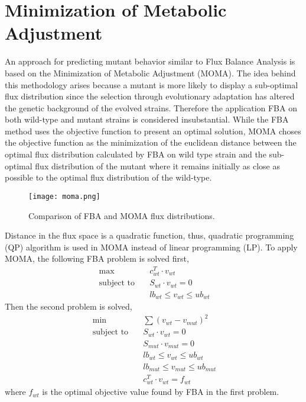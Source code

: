 \section{Minimization of Metabolic Adjustment}
An approach for predicting mutant behavior similar to Flux Balance Analysis is based on the Minimization of Metabolic Adjustment (MOMA). The idea behind this methodology arises because a mutant is more likely to display a sub-optimal flux distribution since the selection through evolutionary adaptation has altered the genetic background of the evolved strains. Therefore the application FBA on both wild-type and mutant strains is considered insubstantial. While the FBA method uses the objective function to present an optimal solution, MOMA choses the objective function as the minimization of the euclidean distance between the optimal flux distribution calculated by FBA on wild type strain and the sub-optimal flux distribution of the mutant where it remains initially as close as possible to the optimal flux distribution of the wild-type.

\begin{figure}[H]
\begin{center}
\texttt{[image: moma.png]}
\caption[Comparison of FBA and MOMA flux distributions]{Comparison of FBA and MOMA flux distributions.}
\end{center}
\label{fig:moma}
\end{figure}
\noindent
Distance in the flux space is a quadratic function, thus, quadratic programming (QP) algorithm is used in MOMA instead of linear programming (LP). To apply MOMA, the following FBA problem is solved first,
\begin{align}
 \ \text{max} \quad & c^T_{wt} \cdot v_{wt} \\
 \label{eq:moma_1}
 \ \text{subject to} \quad & S_{wt} \cdot v_{wt}=0 \\
 \ & lb_{wt} \leq v_{wt} \leq ub_{wt}
\end{align}
\noindent
Then the second problem is solved,
\begin{align}
 \ \text{min} \quad & \sum (v_{wt} - v_{mut})^2\\
 \label{eq:moma_2}
 \ \text{subject to} \quad & S_{wt} \cdot v_{wt}=0 \\
 \ & S_{mut} \cdot v_{mut}=0 \\
 \ & lb_{wt} \leq v_{wt} \leq ub_{wt} \\
 \ & lb_{mut} \leq v_{mut} \leq ub_{mut} \\
 \ & c^T_{wt} \cdot v_{wt} = f_{wt}
\end{align}
\noindent
where $f_{wt}$ is the optimal objective value found by FBA in the first problem.

